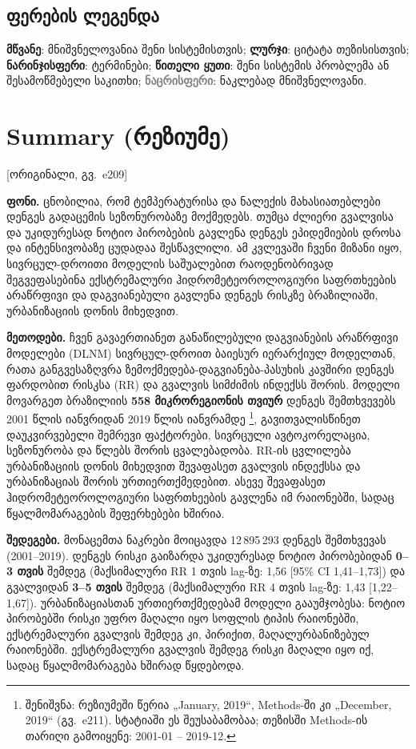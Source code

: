 \documentclass[11pt,a4paper]{article}
\newcommand{\pg}[1]{{\small\color{gray}[ორიგინალი, გვ.~#1]}}
\begin{document}
\subsection*{ფერების ლეგენდა}
\textcolor{brandgreen}{\textbf{მწვანე}}: მნიშვნელოვანია შენი სისტემისთვის;
\textcolor{quoteblue}{\textbf{ლურჯი}}: ციტატა თეზისისთვის;
\textcolor{termorange}{\textbf{ნარინჯისფერი}}: ტერმინები;
\textcolor{importred}{\textbf{წითელი ყუთი}}: შენი სისტემის პრობლემა ან შესამოწმებელი საკითხი;
\textcolor{gray}{\textbf{ნაცრისფერი}}: ნაკლებად მნიშვნელოვანი.

\section{Summary (რეზიუმე)} \pg{e209}

\textbf{ფონი.} ცნობილია, რომ ტემპერატურისა და ნალექის მახასიათებლები დენგეს გადაცემის სეზონურობაზე მოქმედებს. თუმცა ძლიერი
გვალვისა და უკიდურესად ნოტიო პირობების გავლენა დენგეს ეპიდემიების დროსა და ინტენსივობაზე ცუდადაა შესწავლილი. ამ კვლევაში
ჩვენი მიზანი იყო, სივრცულ-დროითი მოდელის საშუალებით რაოდენობრივად შეგვეფასებინა ექსტრემალური ჰიდრომეტეოროლოგიური
საფრთხეების არაწრფივი და დაგვიანებული გავლენა დენგეს რისკზე ბრაზილიაში, ურბანიზაციის დონის მიხედვით.

\textbf{მეთოდები.} ჩვენ გავაერთიანეთ განაწილებული დაგვიანების არაწრფივი მოდელები (DLNM) სივრცულ-დროით ბაიესურ იერარქიულ
მოდელთან, რათა განგვესაზღვრა ზემოქმედება-დაგვიანება-პასუხის კავშირი დენგეს ფარდობით რისკსა (RR) და გვალვის სიმძიმის ინდექსს
შორის. მოდელი მოვარგეთ ბრაზილიის \textbf{558 მიკრორეგიონის თვიურ} დენგეს შემთხვევებს 2001 წლის იანვრიდან 2019 წლის იანვრამდე%
\footnote{შენიშვნა: რეზიუმეში წერია „January, 2019“, Methods-ში კი „December, 2019“ (გვ.~e211). სტატიაში ეს შეუსაბამობაა;
თეზისში Methods-ის თარიღი გამოიყენე: 2001-01 -- 2019-12.},
გავითვალისწინეთ დაუკვირვებელი შემრევი ფაქტორები, სივრცული ავტოკორელაცია, სეზონურობა და წლებს შორის ცვალებადობა. RR-ის
ცვლილება ურბანიზაციის დონის მიხედვით შევაფასეთ გვალვის ინდექსსა და ურბანიზაციას შორის ურთიერთქმედებით. ასევე შევაფასეთ
ჰიდრომეტეოროლოგიური საფრთხეების გავლენა იმ რაიონებში, სადაც წყალმომარაგების შეფერხებები ხშირია.

\textbf{შედეგები.} მონაცემთა ნაკრები მოიცავდა 12\,895\,293 დენგეს შემთხვევას (2001--2019). დენგეს რისკი გაიზარდა უკიდურესად
ნოტიო პირობებიდან \textbf{0--3 თვის} შემდეგ (მაქსიმალური RR 1 თვის lag-ზე: 1,56 [95\% CI 1,41--1,73]) და გვალვიდან
\textbf{3--5 თვის} შემდეგ (მაქსიმალური RR 4 თვის lag-ზე: 1,43 [1,22--1,67]). ურბანიზაციასთან ურთიერთქმედებამ მოდელი გააუმჯობესა:
ნოტიო პირობებში რისკი უფრო მაღალი იყო სოფლის ტიპის რაიონებში, ექსტრემალური გვალვის შემდეგ კი, პირიქით, მაღალურბანიზებულ
რაიონებში. ექსტრემალური გვალვის შემდეგ რისკი მაღალი იყო იქ, სადაც წყალმომარაგება ხშირად წყდებოდა.
\end{document}
